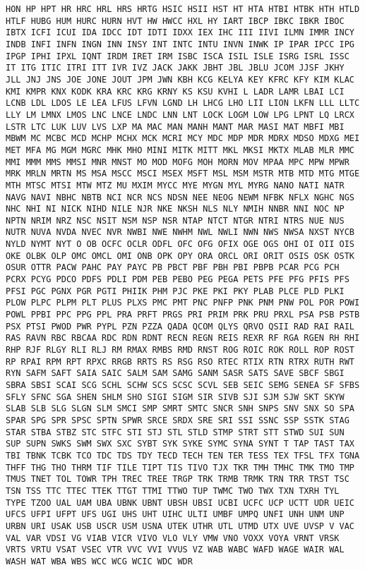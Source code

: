 \documentclass[11pt]{article}
\begin{document}
\begin{Verbatim}[commandchars=\\\{\}]
HON HP HPT HR HRC HRL HRS HRTG HSIC HSII HST HT HTA HTBI HTBK HTH HTLD HTLF HUBG HUM HURC HURN HVT HW HWCC HXL HY IART IBCP IBKC IBKR IBOC IBTX ICFI ICUI IDA IDCC IDT IDTI IDXX IEX IHC III IIVI ILMN IMMR INCY INDB INFI INFN INGN INN INSY INT INTC INTU INVN INWK IP IPAR IPCC IPG IPGP IPHI IPXL IQNT IRDM IRET IRM ISBC ISCA ISIL ISLE ISRG ISRL ISSC IT ITG ITIC ITRI ITT IVR IVZ JACK JAKK JBHT JBL JBLU JCOM JJSF JKHY JLL JNJ JNS JOE JONE JOUT JPM JWN KBH KCG KELYA KEY KFRC KFY KIM KLAC KMI KMPR KNX KODK KRA KRC KRG KRNY KS KSU KVHI L LADR LAMR LBAI LCI LCNB LDL LDOS LE LEA LFUS LFVN LGND LH LHCG LHO LII LION LKFN LLL LLTC LLY LM LMNX LMOS LNC LNCE LNDC LNN LNT LOCK LOGM LOW LPG LPNT LQ LRCX LSTR LTC LUK LUV LVS LXP MA MAC MAN MANH MANT MAR MASI MAT MBFI MBI MBWM MC MCBC MCD MCHP MCHX MCK MCRI MCY MDC MDP MDR MDRX MDSO MDXG MEI MET MFA MG MGM MGRC MHK MHO MINI MITK MITT MKL MKSI MKTX MLAB MLR MMC MMI MMM MMS MMSI MNR MNST MO MOD MOFG MOH MORN MOV MPAA MPC MPW MPWR MRK MRLN MRTN MS MSA MSCC MSCI MSEX MSFT MSL MSM MSTR MTB MTD MTG MTGE MTH MTSC MTSI MTW MTZ MU MXIM MYCC MYE MYGN MYL MYRG NANO NATI NATR NAVG NAVI NBHC NBTB NCI NCR NCS NDSN NEE NEOG NEWM NFBK NFLX NGHC NGS NHC NHI NI NICK NIHD NILE NJR NKE NKSH NLS NLY NMIH NNBR NNI NOC NP NPTN NRIM NRZ NSC NSIT NSM NSP NSR NTAP NTCT NTGR NTRI NTRS NUE NUS NUTR NUVA NVDA NVEC NVR NWBI NWE NWHM NWL NWLI NWN NWS NWSA NXST NYCB NYLD NYMT NYT O OB OCFC OCLR ODFL OFC OFG OFIX OGE OGS OHI OI OII OIS OKE OLBK OLP OMC OMCL OMI ONB OPK OPY ORA ORCL ORI ORIT OSIS OSK OSTK OSUR OTTR PACW PAHC PAY PAYC PB PBCT PBF PBH PBI PBPB PCAR PCG PCH PCRX PCYG PDCO PDFS PDLI PDM PEB PEBO PEG PEGA PETS PFE PFG PFIS PFS PFSI PGC PGNX PGR PGTI PHIIK PHM PJC PKE PKI PKY PLAB PLCE PLD PLKI PLOW PLPC PLPM PLT PLUS PLXS PMC PMT PNC PNFP PNK PNM PNW POL POR POWI POWL PPBI PPC PPG PPL PRA PRFT PRGS PRI PRIM PRK PRU PRXL PSA PSB PSTB PSX PTSI PWOD PWR PYPL PZN PZZA QADA QCOM QLYS QRVO QSII RAD RAI RAIL RAS RAVN RBC RBCAA RDC RDN RDNT RECN REGN REIS REXR RF RGA RGEN RH RHI RHP RJF RLGY RLI RLJ RM RMAX RMBS RMD RNST ROG ROIC ROK ROLL ROP ROST RP RPAI RPM RPT RPXC RRGB RRTS RS RSG RSO RTEC RTIX RTN RTRX RUTH RWT RYN SAFM SAFT SAIA SAIC SALM SAM SAMG SANM SASR SATS SAVE SBCF SBGI SBRA SBSI SCAI SCG SCHL SCHW SCS SCSC SCVL SEB SEIC SEMG SENEA SF SFBS SFLY SFNC SGA SHEN SHLM SHO SIGI SIGM SIR SIVB SJI SJM SJW SKT SKYW SLAB SLB SLG SLGN SLM SMCI SMP SMRT SMTC SNCR SNH SNPS SNV SNX SO SPA SPAR SPG SPR SPSC SPTN SPWR SRCE SRDX SRE SRI SSI SSNC SSP SSTK STAG STAR STBA STBZ STC STFC STI STJ STL STLD STMP STRT STT STWD SUI SUN SUP SUPN SWKS SWM SWX SXC SYBT SYK SYKE SYMC SYNA SYNT T TAP TAST TAX TBI TBNK TCBK TCO TDC TDS TDY TECD TECH TEN TER TESS TEX TFSL TFX TGNA THFF THG THO THRM TIF TILE TIPT TIS TIVO TJX TKR TMH TMHC TMK TMO TMP TMUS TNET TOL TOWR TPH TREC TREE TRGP TRK TRMB TRMK TRN TRR TRST TSC TSN TSS TTC TTEC TTEK TTGT TTMI TTWO TUP TWMC TWO TWX TXN TXRH TYL TYPE TZOO UAL UAM UBA UBNK UBNT UBSH UBSI UCBI UCFC UCP UCTT UDR UEIC UFCS UFPI UFPT UFS UGI UHS UHT UIHC ULTI UMBF UMPQ UNFI UNH UNM UNP URBN URI USAK USB USCR USM USNA UTEK UTHR UTL UTMD UTX UVE UVSP V VAC VAL VAR VDSI VG VIAB VICR VIVO VLO VLY VMW VNO VOXX VOYA VRNT VRSK VRTS VRTU VSAT VSEC VTR VVC VVI VVUS VZ WAB WABC WAFD WAGE WAIR WAL WASH WAT WBA WBS WCC WCG WCIC WDC WDR 
\end{Verbatim}
\end{document}

